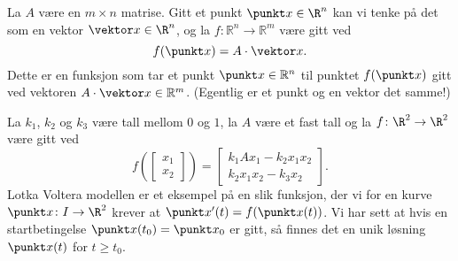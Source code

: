 
\begin{eksempel}
  La $A$ være en $m \times n$ matrise. Gitt et punkt $\punkt x \in \R^n$ kan vi
  tenke på det som en vektor $\vektor x \in \R^n$, og la $f: \mathbb{R}^n \to \mathbb{R}^m$ være gitt ved
  $$f(\punkt x) = A\cdot \vektor x.$$
  Dette er en funksjon som tar et punkt $\punkt x \in \mathbb{R}^n$ til punktet
  $f(\punkt x)$ gitt ved vektoren $A\cdot \vektor x \in \mathbb{R}^m$.
  (Egentlig er et punkt og en vektor det samme!)
\end{eksempel}

\begin{eksempel}
  La $k_1$, $k_2$ og $k_3$ være tall mellom $0$ og $1$, la $A$ være et fast tall  og la 
  $f \colon \R^2 \to \R^2$ være gitt ved
  $$f(\begin{bmatrix} x_1 \\ x_2 \end{bmatrix}) = \begin{bmatrix} k_1 A x_1 - k_2 x_1 x_2 \\
  k_2 x_1 x_2 - k_3 x_2 \end{bmatrix}.$$
  Lotka Voltera modellen er et eksempel på en slik funksjon, der vi for en kurve $\punkt x \colon I \to \R^2$
  krever at $\punkt x'(t) = f(\punkt x(t))$. Vi har sett at hvis en
  startbetingelse $\punkt x(t_0) = \punkt x_0$ er gitt, så finnes det en unik
  løsning $\punkt x(t)$ for $t \geq t_0$.
\end{eksempel}

